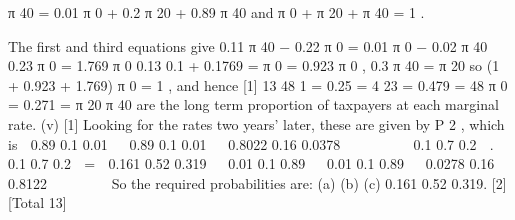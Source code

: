 \documentclass[a4paper,12pt]{article}
\begin{document}
π 40 = 0.01 π 0 + 0.2 π 20 + 0.89 π 40
and
π 0 + π 20 + π 40 = 1 .

The first and third equations give
0.11 π 40 − 0.22 π 0 = 0.01 π 0 − 0.02 π 40
0.23
π 0 = 1.769 π 0
0.13
0.1 + 0.1769
=
π 0 = 0.923 π 0 ,
0.3
π 40 =
π 20
so (1 + 0.923 + 1.769) π 0 = 1 , and hence
[1]
13
48
1
= 0.25 =
4
23
= 0.479 =
48
π 0 = 0.271 =
π 20
π 40
are the long term proportion of taxpayers at each marginal rate.
(v)
[1]
Looking for the rates two years’ later, these are given by P 2 , which is
 0.89 0.1 0.01   0.89 0.1 0.01   0.8022 0.16 0.0378 

 
 

 0.1 0.7 0.2  .  0.1 0.7 0.2  =  0.161 0.52 0.319 
 0.01 0.1 0.89   0.01 0.1 0.89   0.0278 0.16 0.8122 

 
 

So the required probabilities are:
(a)
(b)
(c)
0.161
0.52
0.319.
[2]
[Total 13]

\end{document}
